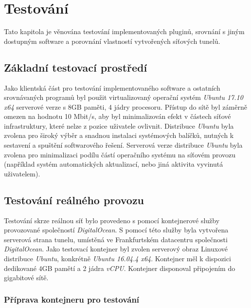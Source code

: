 \documentclass[thesis=M,czech]{FITthesis}[2012/10/20]
\begin{document}
    
    


\chapter{Testování}

Tato kapitola je věnována testování implementovaných pluginů, srovnání s jiným dostupným software a porovnání vlastností vytvořených síťových tunelů.

\section{Základní testovací prostředí}
\label{test:prostredi}

Jako klientská část pro testování implementovaného software a ostatních srovnávaných programů byl použit virtualizovaný operační systém \textit{Ubuntu 17.10 x64} serverové verze s 8GB paměti, 4 jádry procesoru. Přístup do sítě byl záměrně omezen na hodnotu 10 Mbit/s, aby byl minimalizován efekt  v částech síťové infrastruktury, které nelze z pozice uživatele ovlivnit. Distribuce \textit{Ubuntu} byla zvolena pro široký výběr a snadnou instalaci systémových balíčků, nutných k sestavení a spuštění softwarového řešení. Serverová verze distribuce \textit{Ubuntu} byla zvolena pro minimalizaci podílu částí operačního systému na síťovém provozu (například systém automatických aktualizací, nebo jiná aktivita vyvinutá uživatelem).

\section{Testování reálného provozu}

Testování skrze reálnou síť bylo provedeno s pomocí kontejnerové služby provozované společností \textit{DigitalOcean}. S pomocí této služby byla vytvořena serverová strana tunelu, umístěná ve Frankfurtském datacentru společnosti \textit{\mbox{DigitalOcean}}. Jako testovací kontejner byl zvolen serverový obraz Linuxové distribuce \textit{Ubuntu}, konkrétně \textit{Ubuntu 16.04.4 x64}. Kontejner měl k dispozici dedikované 4GB pamětí a 2 jádra \textit{vCPU}. Kontejner disponoval připojením do gigabitové sítě.

\subsection{Příprava kontejneru pro testování}
\end{document}
